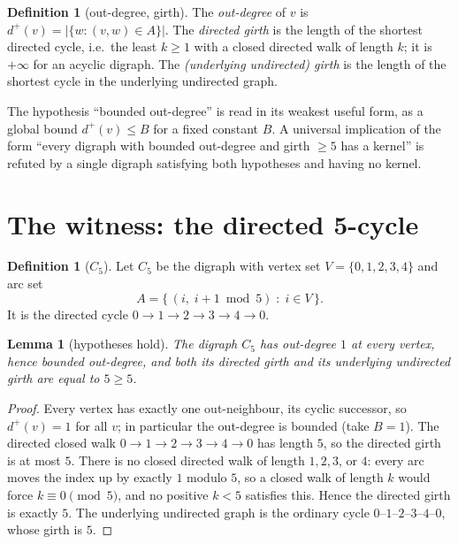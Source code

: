 \documentclass[11pt]{article}
\newtheorem{lemma}[theorem]{Lemma}
\theoremstyle{definition}
\newtheorem{definition}[theorem]{Definition}
\theoremstyle{remark}
\newcommand{\Cfive}{C_5}
\begin{document}
\begin{definition}[out-degree, girth]
The \emph{out-degree} of $v$ is $d^+(v) = |\{w : (v,w) \in A\}|$. The
\emph{directed girth} is the length of the shortest directed cycle, i.e.\ the
least $k \ge 1$ with a closed directed walk of length $k$; it is $+\infty$ for
an acyclic digraph. The \emph{(underlying undirected) girth} is the length of
the shortest cycle in the underlying undirected graph.
\end{definition}

The hypothesis ``bounded out-degree'' is read in its weakest useful form, as a
global bound $d^+(v) \le B$ for a fixed constant $B$. A universal implication of
the form ``every digraph with bounded out-degree and girth $\ge 5$ has a
kernel'' is refuted by a single digraph satisfying both hypotheses and having no
kernel.

\section{The witness: the directed 5-cycle}

\begin{definition}[$\Cfive$]
Let $\Cfive$ be the digraph with vertex set $V = \{0, 1, 2, 3, 4\}$ and arc set
\[
A = \{\, (i,\; i + 1 \bmod 5) \;:\; i \in V \,\}.
\]
It is the directed cycle $0 \to 1 \to 2 \to 3 \to 4 \to 0$.
\end{definition}

\begin{lemma}[hypotheses hold]\label{lem:hyp}
The digraph $\Cfive$ has out-degree $1$ at every vertex, hence bounded
out-degree, and both its directed girth and its underlying undirected girth are
equal to $5 \ge 5$.
\end{lemma}

\begin{proof}
Every vertex has exactly one out-neighbour, its cyclic successor, so
$d^+(v) = 1$ for all $v$; in particular the out-degree is bounded (take
$B = 1$). The directed closed walk $0 \to 1 \to 2 \to 3 \to 4 \to 0$ has length
$5$, so the directed girth is at most $5$. There is no closed directed walk of
length $1, 2, 3$, or $4$: every arc moves the index up by exactly $1$ modulo
$5$, so a closed walk of length $k$ would force $k \equiv 0 \pmod 5$, and no
positive $k < 5$ satisfies this. Hence the directed girth is exactly $5$. The
underlying undirected graph is the ordinary cycle $0$--$1$--$2$--$3$--$4$--$0$,
whose girth is $5$.
\end{proof}
\end{document}

